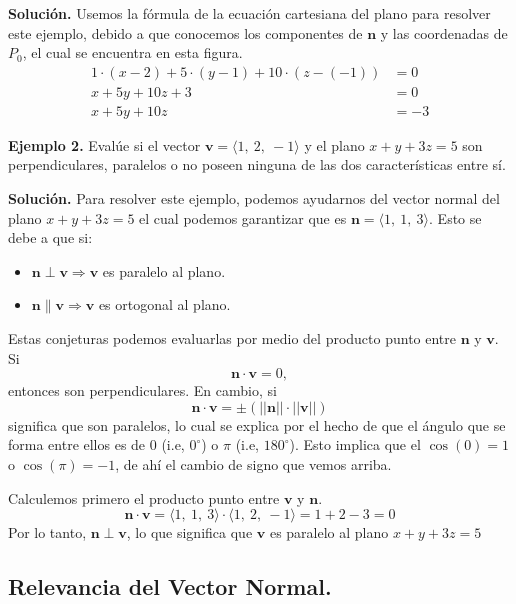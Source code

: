 \documentclass[12pt]{article}
\begin{document}
\textbf{Solución.} Usemos la fórmula de la ecuación cartesiana del plano para resolver este ejemplo, debido a que conocemos los componentes de $\mathbf{n}$ y las coordenadas de $P_{0}$, el cual se encuentra en esta figura.
\begin{align*}
  1 \cdot (x - 2) + 5 \cdot (y - 1) + 10 \cdot (z - (-1)) &= 0 \\
  x + 5y + 10z + 3 &= 0 \\
  x + 5y + 10z &= -3
\end{align*}

\textbf{Ejemplo 2.} Evalúe si el vector $\mathbf{v} = \langle 1, \ 2, \ -1 \rangle$ y el plano $x + y + 3z = 5$ son perpendiculares, paralelos o no poseen ninguna de las dos características entre sí.

\textbf{Solución.} Para resolver este ejemplo, podemos ayudarnos del vector normal del plano $x + y + 3z = 5$ el cual podemos garantizar que es $\mathbf{n} = \langle 1, \ 1, \ 3 \rangle$. Esto se debe a que si:

\begin{itemize}
\item $\mathbf{n} \perp \mathbf{v} \Longrightarrow \mathbf{v}$ es paralelo al plano.
\item $\mathbf{n} \parallel \mathbf{v} \Longrightarrow \mathbf{v}$ es ortogonal al plano.
\end{itemize}

Estas conjeturas podemos evaluarlas por medio del producto punto entre $\mathbf{n}$ y $\mathbf{v}$. Si
\[
 \mathbf{n} \cdot \mathbf{v} = 0,
\]
entonces son perpendiculares. En cambio, si
\[
  \mathbf{n} \cdot \mathbf{v} = \pm \left(||\mathbf{n}|| \cdot ||\mathbf{v}||\right)
\]
significa que son paralelos, lo cual se explica por el hecho de que el ángulo que se forma entre ellos es de $0$ (i.e, $0^{\circ}$) o $\pi$ (i.e, $180^{\circ}$). Esto implica que el $\cos(0) = 1$ o $\cos(\pi) = -1$, de ahí el cambio de signo que vemos arriba.

Calculemos primero el producto punto entre $\mathbf{v}$ y $\mathbf{n}$.
\[
  \mathbf{n} \cdot \mathbf{v} = \langle 1, \ 1, \ 3 \rangle \cdot \langle 1, \ 2, \ -1 \rangle = 1 + 2 - 3 = 0
\]
Por lo tanto, $\mathbf{n} \perp \mathbf{v}$, lo que significa que $\mathbf{v}$ es paralelo al plano $x + y + 3z = 5$

\subsection{Relevancia del Vector Normal.}
\end{document}
